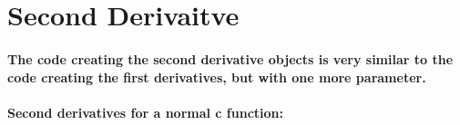 \documentclass[9pt,onside]{article}
\begin{document}
\normalfont
\normalsize

\section{Second Derivaitve}

\paragraph{The code creating the second derivative objects is very similar to the code creating the first derivatives, but with one more parameter.\\}
\paragraph{Second derivatives for a normal c function:\\}
\noindent
\ttfamily
\end{document}

